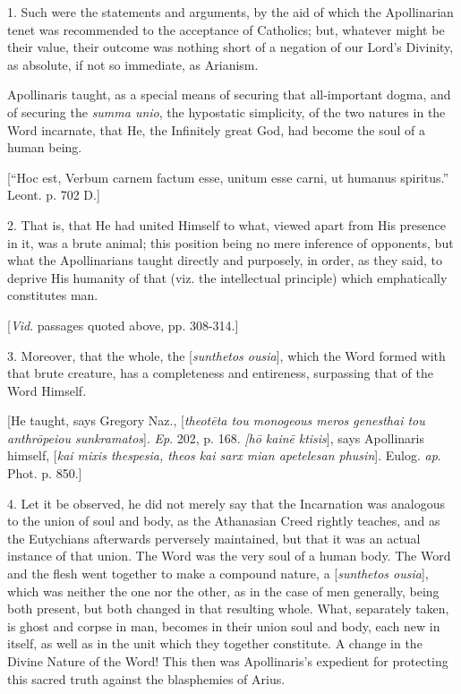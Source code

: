 
1. Such were the statements and arguments, by the aid of which the
Apollinarian tenet was recommended to the acceptance of Catholics;
but, whatever might be their value, their outcome was nothing short of
a negation of our Lord's Divinity, as absolute, if not so immediate,
as Arianism.

Apollinaris taught, as a special means of securing that
all-important dogma, and of securing the \emph{summa unio}, the
hypostatic simplicity, of the two natures in the Word incarnate, that
He, the Infinitely great God, had become the soul of a human being.

[``Hoc est, Verbum carnem factum esse, unitum esse carni, ut
humanus spiritus.'' Leont. p. 702 D.]

2. That is, that He had united Himself to what, viewed apart from
His presence in it, was a brute animal; this position being no mere
inference of opponents, but what the Apollinarians taught directly and
purposely, in order, as they said, to deprive His humanity of that
(viz. the intellectual principle) which emphatically constitutes man.

[\emph{Vid}. passages quoted above, pp. 308-314.]

3. Moreover, that the whole, the [\emph{sunthetos ousia}], which
the Word formed with that brute creature, has a completeness and
entireness, surpassing that of the Word Himself.

[He taught, says Gregory Naz., [\emph{theot\={e}ta tou monogeous
meros genesthai tou anthr\={o}peiou sunkramatos}]. \emph{Ep}.
202, p. 168. \emph{[h\={o} kain\={e}} \emph{ktisis}],
says Apollinaris himself, [\emph{kai mixis thespesia, theos kai sarx mian
apetelesan phusin}]. Eulog. \emph{ap}. Phot. p. 850.]

4. Let it be observed, he did not merely say that the Incarnation
was analogous to the union of soul and body, as the Athanasian Creed
rightly teaches, and as the Eutychians afterwards perversely
maintained, but that it was an actual instance of that union. The Word
was the very soul of a human body. The Word and the flesh went
together to make a compound nature, a [\emph{sunthetos ousia}], which
was neither the one nor the other, as in the case of men generally,
being both present, but both changed in that resulting whole. What,
separately taken, is ghost and corpse in man, becomes in their union
soul and body, each new in itself, as well as in the unit which they
together constitute. A change in the Divine Nature of the Word! This
then was Apollinaris's expedient for protecting this sacred truth
against the blasphemies of Arius.


